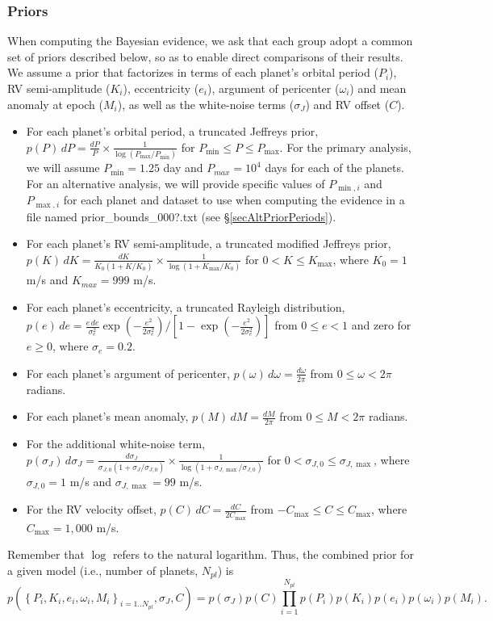 \documentclass{article}
\begin{document}
\subsubsection{Priors}

When computing the Bayesian evidence, we ask that each group adopt a common set of priors described below, so as to enable direct comparisons of their results.  
We assume a prior that factorizes in terms of each planet's orbital period ($P_i$), RV semi-amplitude ($K_i$), eccentricity ($e_i$), argument of pericenter ($\omega_i$) and mean anomaly at epoch ($M_i$), as well as the white-noise terms ($\sigma_J$) and RV offset ($C$).   
%
\begin{itemize}
\item For each planet's orbital period, a truncated Jeffreys prior, $p(P) \, dP = \frac{dP}{P} \times  \frac{1}{\log(P_{\max}/P_{\min})}$ for $P_{\min} \le P \le P_{\max}$.  For the primary analysis, we will assume $P_{\min}=1.25$ day and $P_{max}=10^4$ days for each of the planets.  For an alternative analysis, we will provide specific values of $P_{\min,i}$ and $P_{\max,i}$ for each planet and dataset to use when computing the evidence in a file named prior\_bounds\_000?.txt (see \S\ref{secAltPriorPeriods}).  
\item For each planet's RV semi-amplitude, a truncated modified Jeffreys prior, $p(K) \, dK = \frac{dK}{K_0(1+K/K_0)} \times  \frac{1}{\log(1+K_{\max}/K_0)}$ for $0<K\le K_{\max}$, where $K_0=1$ m/s and $K_{max}=999$ m/s.
\item For each planet's eccentricity, a truncated Rayleigh distribution, $p(e) \, de = \frac{e\, de}{\sigma_e^2} \exp\left(-\frac{e^2}{2\sigma_e^2}\right) / \left[ 1-\exp\left(-\frac{e^2}{2\sigma_e^2}\right) \right]$ from $0 \leq e < 1$ and zero for $e\ge0$, where $\sigma_e = 0.2$.
\item For each planet's argument of pericenter, $p(\omega) \, d\omega = \frac{d\omega}{2\pi}$ from $0 \leq \omega < 2\pi$ radians.
\item For each planet's mean anomaly, $p(M) \, dM = \frac{dM}{2\pi}$ from $0 \leq M < 2\pi$ radians.
\item For the additional white-noise term, $p(\sigma_J) \, d\sigma_J = \frac{d\sigma_J}{\sigma_{J,0}(1+\sigma_J/\sigma_{J,0})} \times  \frac{1}{\log(1+\sigma_{J,\max}/\sigma_{J,0})}$ for $0<\sigma_{J,0} \le \sigma_{J,\max}$, where $\sigma_{J,0}=1$ m/s and $\sigma_{J,\max}=99$ m/s.
\item For the RV velocity offset, $p(C) \, dC = \frac{dC}{2C_{\max}}$ from $-C_{\max} \le C \le C_{\max}$, where $C_{\max} = 1,000$ m/s.
\end{itemize}
%
Remember that $\log$ refers to the natural logarithm.
Thus, the combined prior for a given model (i.e., number of planets, $N_{pl}$) is
%
\begin{equation}
p\left(\left\{P_i,K_i,e_i,\omega_i,M_i\right\}_{i=1..N_{pl}}, \sigma_J, C \right) =
p(\sigma_J) p(C) \prod_{i=1}^{N_{pl}} p(P_i) p(K_i) p(e_i) p(\omega_i) p(M_i).
\end{equation}
%
\end{document}
